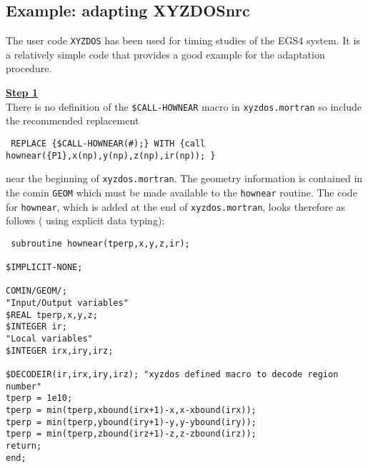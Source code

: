 \subsection{Example: adapting XYZDOSnrc}
\label{adapt_xyzdos}

The user code {\tt XYZDOS} has been used for timing studies of the
EGS4 system\cite{BR92}. It is a relatively simple code that
provides a good example for the adaptation procedure.


\noindent
\underline{\bf Step 1} \hfill \\
There is no definition of the {\tt \$CALL-HOWNEAR} macro
in {\tt xyzdos.mortran} so include the recommended replacement
\begin{flushleft} {\tt
REPLACE \{\$CALL-HOWNEAR(\#);\} WITH
\{call hownear(\{P1\},x(np),y(np),z(np),ir(np)); \}
\\ }
\end{flushleft}
near the beginning of {\tt xyzdos.mortran}.
The geometry information is contained in
the comin {\tt GEOM} which must be made available
to the {\tt hownear} routine. The code
for {\tt hownear}, which is added at the end of {\tt xyzdos.mortran},
looks therefore as follows ( using explicit data typing):
\begin{flushleft} {\tt
subroutine hownear(tperp,x,y,z,ir);\\
~\\
\$IMPLICIT-NONE;\\
~\\
COMIN/GEOM/;\\
"Input/Output variables"\\
\$REAL tperp,x,y,z;\\
\$INTEGER ir;\\
"Local variables"\\
\$INTEGER irx,iry,irz;\\
~\\
\$DECODEIR(ir,irx,iry,irz); "xyzdos defined macro to decode region number"\\
tperp = 1e10;\\
tperp = min(tperp,xbound(irx+1)-x,x-xbound(irx));\\
tperp = min(tperp,ybound(iry+1)-y,y-ybound(iry));\\
tperp = min(tperp,zbound(irz+1)-z,z-zbound(irz));\\
return;\\
end;\\
}
\end{flushleft}


